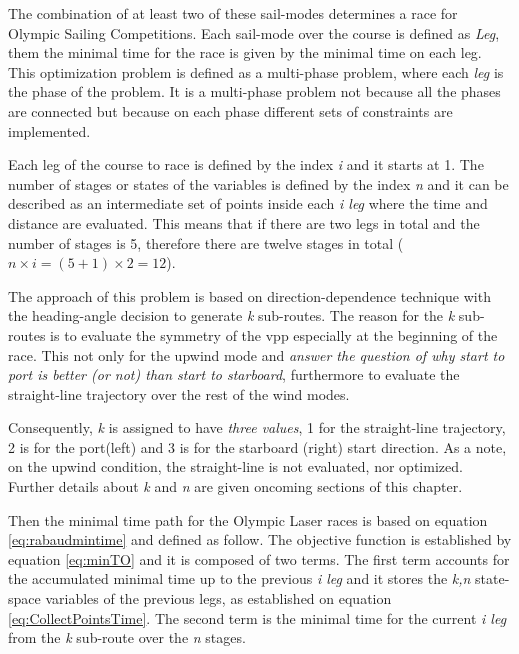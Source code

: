 The combination of at least two of these sail-modes determines a race for Olympic Sailing Competitions. Each sail-mode over the course is defined as \textit{Leg}, them the minimal time for the race is given by the minimal time on each leg. This optimization problem is defined as a multi-phase problem, where each \textit{leg} is the phase of the problem. It is a multi-phase problem not because all the phases are connected but because on each phase different sets of constraints are implemented.\par
Each leg of the course to race is defined by the index \textit{i} and it starts at 1. %
The number of stages or states of the variables is defined by the index \textit{n} and it can be described as an intermediate set of points inside each \textit{i leg} where the time and distance are evaluated.  This means that if there are two legs in total and the number of stages is 5, therefore there are twelve stages in total (\textit{$n \times i = (5+ 1) \times 2 = 12$}).\par 
The approach of this problem is based on direction-dependence technique with the heading-angle decision to generate \textit{k} sub-routes. The reason for the \textit{k} sub-routes is to evaluate the symmetry of the \acrshort{vpp} especially at the beginning of the race.
This not only for the upwind mode and \textit{answer the question of why start to port is better (or not) than start to starboard}, furthermore to evaluate the straight-line trajectory over the rest of the wind modes. \par \noindent %
Consequently, \textit{k} is assigned to have \textit{three values}, 1 for the straight-line trajectory, 2 is for the port(left) and 3 is for the starboard (right) start direction. As a note, on the upwind condition, the straight-line is not evaluated, nor optimized. Further details about \textit{k} and \textit{n} are given oncoming sections of this chapter.\par 
Then the minimal time path for the Olympic Laser races is based on equation \ref{eq:rabaudmintime} and defined as follow.
The objective function is established by equation \ref{eq:minTO} and it is composed of two terms. The first term accounts for the accumulated minimal time up to the previous \textit{i leg} and it stores the  \textit{k,n} state-space variables of the previous legs, as established on equation \ref{eq:CollectPointsTime}.
The second term is the minimal time for the current \textit{i leg} from the \textit{k} sub-route over the \textit{n} stages. \par \noindent 

